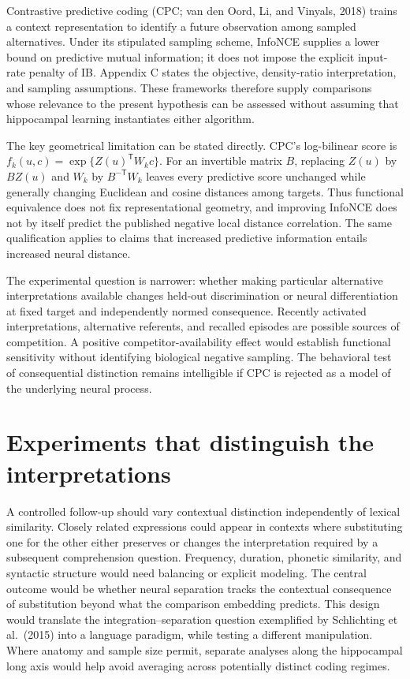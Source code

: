 \documentclass[11pt]{article}
\begin{document}
Contrastive predictive coding (CPC; van den Oord, Li, and Vinyals, 2018)
trains a context representation to identify a future observation among
sampled alternatives. Under its stipulated sampling scheme, InfoNCE
supplies a lower bound on predictive mutual information; it does not
impose the explicit input-rate penalty of IB. Appendix C states the
objective, density-ratio interpretation, and sampling assumptions. These
frameworks therefore supply comparisons whose relevance to the present
hypothesis can be assessed without assuming that hippocampal learning
instantiates either algorithm.

The key geometrical limitation can be stated directly. CPC's
log-bilinear score is \(f_k(u,c)=\exp\{Z(u)^{\mathsf T}W_kc\}\). For an
invertible matrix \(B\), replacing \(Z(u)\) by \(BZ(u)\) and \(W_k\) by
\(B^{-\mathsf T}W_k\) leaves every predictive score unchanged while
generally changing Euclidean and cosine distances among targets. Thus
functional equivalence does not fix representational geometry, and
improving InfoNCE does not by itself predict the published negative
local distance correlation. The same qualification applies to claims
that increased predictive information entails increased neural distance.

The experimental question is narrower: whether making particular
alternative interpretations available changes held-out discrimination or
neural differentiation at fixed target and independently normed
consequence. Recently activated interpretations, alternative referents,
and recalled episodes are possible sources of competition. A positive
competitor-availability effect would establish functional sensitivity
without identifying biological negative sampling. The behavioral test of
consequential distinction remains intelligible if CPC is rejected as a
model of the underlying neural process.

\hypertarget{experiments-that-distinguish-the-interpretations}{%
\section{Experiments that distinguish the
interpretations}\label{experiments-that-distinguish-the-interpretations}}

A controlled follow-up should vary contextual distinction independently
of lexical similarity. Closely related expressions could appear in
contexts where substituting one for the other either preserves or
changes the interpretation required by a subsequent comprehension
question. Frequency, duration, phonetic similarity, and syntactic
structure would need balancing or explicit modeling. The central outcome
would be whether neural separation tracks the contextual consequence of
substitution beyond what the comparison embedding predicts. This design
would translate the integration--separation question exemplified by
Schlichting et al.~(2015) into a language paradigm, while testing a
different manipulation. Where anatomy and sample size permit, separate
analyses along the hippocampal long axis would help avoid averaging
across potentially distinct coding regimes.
\end{document}
